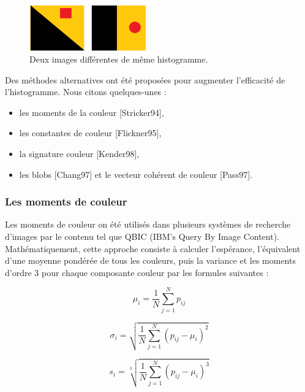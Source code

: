 \begin{figure}[H]
	\label{fig:samehist}
	\centering
	\includegraphics[width=0.45\textwidth]{Figures/sameHist} %
	\caption{Deux images différentes de même histogramme.}
\end{figure}

Des méthodes alternatives ont été proposées pour augmenter l'efficacité de l'histogramme. Nous citons quelques-unes : 
\begin{itemize}
	\item les moments de la couleur [Stricker94], 
	\item les constantes de couleur [Flickner95],
	\item la signature couleur [Kender98], 
	\item les blobs [Chang97] et le vecteur cohérent de couleur [Pass97].
\end{itemize}


\subsubsection{Les moments de couleur}
Les moments de couleur on été utilisés dans plusieurs systèmes de recherche d’images par le contenu tel que QBIC (IBM's Query By Image Content). Mathématiquement, cette approche consiste à calculer l’espérance, l’équivalent d’une moyenne pondérée de tous les couleurs, puis la variance et les moments d’ordre 3 pour chaque composante couleur par les formules suivantes :

\begin{equation}
	\mu_i = \frac{1}{N} \sum_{j=1}^{N} p_{ij}
\end{equation}

\begin{equation}
	\sigma_i = \sqrt{\frac{1}{N} \sum_{j=1}^{N} (p_{ij}-\mu_i)^2}
\end{equation}

\begin{equation}
	s_i = \sqrt[3]{\frac{1}{N} \sum_{j=1}^{N} (p_{ij}-\mu_i)^3}
\end{equation}

